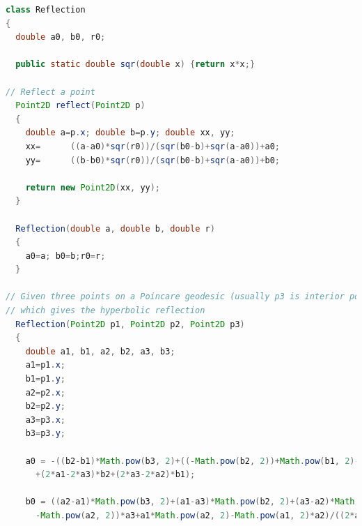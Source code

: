 \documentclass{article}
\begin{document}
{\tiny
\begin{lstlisting}[language = Java,breaklines = true]
class Reflection
{
  double a0, b0, r0;

  public static double sqr(double x) {return x*x;}

// Reflect a point
  Point2D reflect(Point2D p)
  {
    double a=p.x; double b=p.y; double xx, yy;
    xx=      ((a-a0)*sqr(r0))/(sqr(b0-b)+sqr(a-a0))+a0;
    yy=      ((b-b0)*sqr(r0))/(sqr(b0-b)+sqr(a-a0))+b0;

    return new Point2D(xx, yy);
  }

  Reflection(double a, double b, double r)
  {
    a0=a; b0=b;r0=r;
  }

// Given three points on a Poincare geodesic (usually p3 is interior point on p1 p) calculates the coefficients of the circle inversion 
// which gives the hyperbolic reflection
  Reflection(Point2D p1, Point2D p2, Point2D p3)
  {
    double a1, b1, a2, b2, a3, b3;
    a1=p1.x;
    b1=p1.y;
    a2=p2.x;
    b2=p2.y;
    a3=p3.x;
    b3=p3.y;

    a0 = -((b2-b1)*Math.pow(b3, 2)+((-Math.pow(b2, 2))+Math.pow(b1, 2)-Math.pow(a2, 2)+Math.pow(a1, 2))*b3+b1*Math.pow(b2, 2)+((-Math.pow(b1, 2))+Math.pow(a3, 2)-Math.pow(a1, 2))*b2+(Math.pow(a2, 2)-Math.pow(a3, 2))*b1)/((2*a2-2*a1)*b3
      +(2*a1-2*a3)*b2+(2*a3-2*a2)*b1);

    b0 = ((a2-a1)*Math.pow(b3, 2)+(a1-a3)*Math.pow(b2, 2)+(a3-a2)*Math.pow(b1, 2)+(a2-a1)*Math.pow(a3, 2)+(Math.pow(a1, 2)
      -Math.pow(a2, 2))*a3+a1*Math.pow(a2, 2)-Math.pow(a1, 2)*a2)/((2*a2-2*a1)*b3+(2*a1-2*a3)*b2+(2*a3-2*a2)*b1);


\end{lstlisting}}
\end{document}
